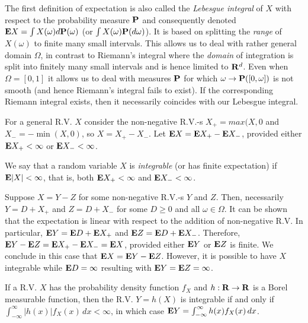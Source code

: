 \begin{remark*} 
The first definition of expectation is also called the \emph{Lebesgue integral}
of $X$ with respect to the probability measure $\mathbf{P}$ and consequently denoted
$\mathbf{E} X = \int X(\omega) d\mathbf{P}(\omega)$ (or $\int X(\omega) \mathbf{P}(d\omega)$). It is
based on splitting the \emph{range} of $X(\omega)$ to finite many small
intervals. This allows us to deal with rather general domain $\Omega$, in
contrast to Riemann's integral where the \emph{domain} of integration is split
into finitely many small intervals and is hence limited to $\mathbf{R}^d$. Even when
$\Omega = [0, 1]$ it allows us to deal with measures $\mathbf{P}$ for which $\omega
\rightarrow \mathbf{P}([0, \omega])$ is not smooth (and hence Riemann's integral fails
to exist). If the corresponding Riemann integral exists, then it necessarily
coincides with our Lebesgue integral.
\end{remark*} 

\begin{definition*} 
For a general R.V. $X$ consider the non-negative R.V.-s $X_+ = max(X, 0$ and
$X_{-} = -\min(X, 0)$, so $X = X_+ - X_-$. Let $\mathbf{E} X = \mathbf{E} X_+ - \mathbf{E} X_-$,
provided either $\mathbf{E} X_+ < \infty$ or $\mathbf{E} X_- < \infty$.
\end{definition*} 

\begin{definition*} 
We say that a random variable $X$ is \emph{integrable} (or has finite
expectation) if $\mathbf{E}|X| < \infty$, that is, both $\mathbf{E} X_+ < \infty$ and $\mathbf{E} X_- <
\infty$.
\end{definition*} 

\begin{remark*} 
Suppose $X = Y - Z$ for some non-negative R.V.-s $Y$ and $Z$. Then, necessarily
$Y = D + X_+$ and $Z = D + X_-$ for some $D \ge 0$ and all $\omega \in \Omega$.
It can be shown that the expectation is linear with respect to the addition of
non-negative R.V. In particular, $\mathbf{E} Y = \mathbf{E} D + \mathbf{E} X_+$ and $\mathbf{E} Z = \mathbf{E} D + \mathbf{E}
X_-$. Therefore, $\mathbf{E} Y - \mathbf{E} Z = \mathbf{E} X_+ - \mathbf{E} X_- = \mathbf{E} X$, provided either $\mathbf{E} Y$ or
$\mathbf{E} Z$ is finite. We conclude in this case that $\mathbf{E} X = \mathbf{E} Y - \mathbf{E} Z$. However,
it is possible to have $X$ integrable while $\mathbf{E} D = \infty$ resulting with $\mathbf{E} Y
= \mathbf{E} Z = \infty$.
\end{remark*} 

\begin{proposition*} 
If a R.V. $X$ has the probability density function $f_X$ and $h: \mathbf{R} \rightarrow
\mathbf{R}$ is a Borel measurable function, then the R.V. $Y = h(X)$ is integrable if
and only if $\int_{-\infty}^\infty |h(x)| f_X (x)\,dx < \infty$, in which case
$\mathbf{E} Y = \int_{-\infty}^\infty h(x) f_X (x)\,dx$.
\end{proposition*} 


